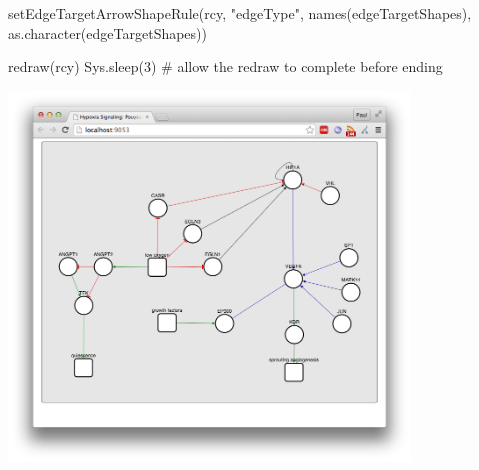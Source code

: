 \documentclass{article}
\begin{document}
setEdgeTargetArrowShapeRule(rcy, "edgeType", names(edgeTargetShapes), as.character(edgeTargetShapes))

redraw(rcy)
Sys.sleep(3)   # allow the redraw to complete before ending


  
\includegraphics[width=0.8\textwidth]{hypoxiaNetwork.png}
\end{document}
